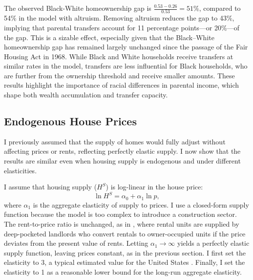 \documentclass[12pt]{article}
\begin{document}
The observed Black-White homeownership gap is $\frac{0.53 - 0.26}{0.53} = 51\%$, compared to 54\% in the model with altruism. Removing altruism reduces the gap to 43\%, implying that parental transfers account for 11 percentage points---or 20\%---of the gap. This is a sizable effect, especially given that the Black–White homeownership gap has remained largely unchanged since the passage of the Fair Housing Act in 1968. While Black and White households receive transfers at similar rates in the model, transfers are less influential for Black households, who are further from the ownership threshold and receive smaller amounts. These results highlight the importance of racial differences in parental income, which shape both wealth accumulation and transfer capacity. 

\subsection{Endogenous House Prices}\label{sec:endoprice}
I previously assumed that the supply of homes would fully adjust without affecting prices or rents, reflecting perfectly elastic supply. I now show that the results are similar even when housing supply is endogenous and under different elasticities.

I assume that housing supply ($H^S$) is log-linear in the house price:
\begin{equation}
\label{eq:hsupply}
\ln H^S = \alpha_0 + \alpha_1 \ln p,
\end{equation}
where $\alpha_1$ is the aggregate elasticity of supply to prices. I use a closed-form supply function because the model is too complex to introduce a construction sector. The rent-to-price ratio is unchanged, as in \cite{Kaplan2020}, where rental units are supplied by deep-pocketed landlords who convert rentals to owner-occupied units if the price deviates from the present value of rents. Letting $\alpha_1\to\infty$ yields a perfectly elastic supply function, leaving prices constant, as in the previous section. I first set the elasticity to 3, a typical estimated value for the United States \cite[see e.g.,][]{saiz2010geographic,aastveit2023changing}. Finally, I set the elasticity to 1 as a reasonable lower bound for the long-run aggregate elasticity.
\end{document}

